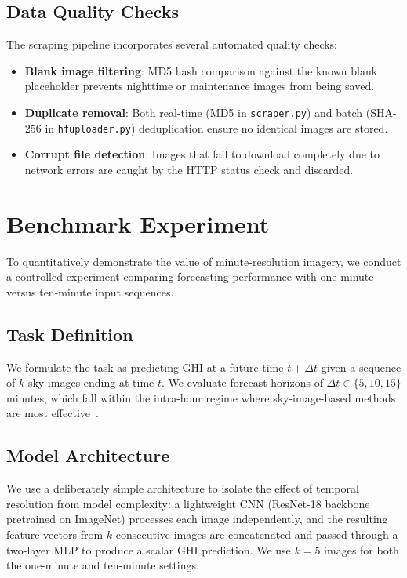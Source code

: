 \documentclass[twoside,11pt]{article}
\begin{document}
\subsection{Data Quality Checks}

The scraping pipeline incorporates several automated quality checks:
\begin{itemize}
    \item \textbf{Blank image filtering}: MD5 hash comparison against the known blank placeholder prevents nighttime or maintenance images from being saved.
    \item \textbf{Duplicate removal}: Both real-time (MD5 in \texttt{scraper.py}) and batch (SHA-256 in \texttt{hfuploader.py}) deduplication ensure no identical images are stored.
    \item \textbf{Corrupt file detection}: Images that fail to download completely due to network errors are caught by the HTTP status check and discarded.
\end{itemize}

\section{Benchmark Experiment}
\label{sec:benchmark}

To quantitatively demonstrate the value of minute-resolution imagery, we conduct a controlled experiment comparing forecasting performance with one-minute versus ten-minute input sequences.

\subsection{Task Definition}

We formulate the task as predicting GHI at a future time $t + \Delta t$ given a sequence of $k$ sky images ending at time $t$. We evaluate forecast horizons of $\Delta t \in \{5, 10, 15\}$ minutes, which fall within the intra-hour regime where sky-image-based methods are most effective~\citep{paletta2023advances}.

\subsection{Model Architecture}

We use a deliberately simple architecture to isolate the effect of temporal resolution from model complexity: a lightweight CNN (ResNet-18 backbone pretrained on ImageNet) processes each image independently, and the resulting feature vectors from $k$ consecutive images are concatenated and passed through a two-layer MLP to produce a scalar GHI prediction. We use $k = 5$ images for both the one-minute and ten-minute settings.
\end{document}
